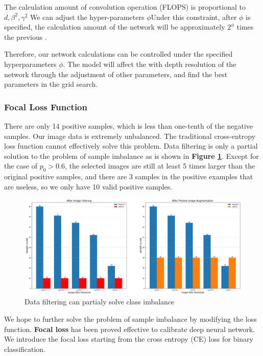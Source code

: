 \documentclass[12pt]{article}
\begin{document}
The calculation amount of convolution operation (FLOPS) is proportional to $d , \beta^{2}, \gamma^{2}$ We can adjust the hyper-parameters $\phi$Under this constraint, after $\phi$ is specified, the calculation amount of the network will be approximately $2^\phi$ times the previous .

Therefore, our network calculations can be controlled under the specified hyperparameters $\phi$. The model will affect the with depth resolution of the network through the adjustment of other parameters, and find the best parameters in the grid search.

\subsubsection{Focal Loss Function}
There are only 14 positive samples, which is less than one-tenth of the negative samples. Our image data is extremely unbalanced. The traditional cross-entropy loss function cannot effectively solve this problem. Data filtering is only a partial solution to the problem of sample imbalance as is shown in \textbf{Figure \ref{Classes_Imbalance}}. Except for the case of $p_0>0.6$, the selected images are still at least 5 times larger than the original positive samples, and there are 3 samples in the positive examples that are useless, so we only have 10 valid positive samples. 

\begin{figure}[H]%
	\small
	\centering
	\includegraphics[width=17cm]{./pictures/Classes_Imbalance.png}
	\caption{Data filtering can partialy solve class imbalance}\label{Classes_Imbalance}
\end{figure}
We hope to further solve the problem of sample imbalance by modifying the loss function. \textbf{Focal loss} has been proved effective to calibrate deep neural network\cite{focal_loss}. We introduce the focal loss starting from the cross entropy (CE) loss for binary classification.
\end{document}
